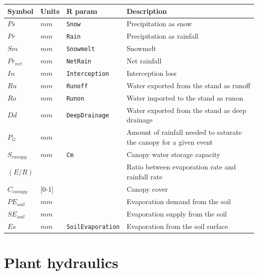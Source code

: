 \documentclass[]{book}
\begin{document}
\begin{longtable}[]{@{}llll@{}}
\toprule
Symbol & Units & R param & Description\tabularnewline
\midrule
\endhead
\(Ps\) & \(mm\) & \texttt{Snow} & Precipitation as snow\tabularnewline
\(Pr\) & \(mm\) & \texttt{Rain} & Precipitation as
rainfall\tabularnewline
\(Sm\) & \(mm\) & \texttt{Snowmelt} & Snowmelt\tabularnewline
\(Pr_{net}\) & \(mm\) & \texttt{NetRain} & Net rainfall\tabularnewline
\(In\) & \(mm\) & \texttt{Interception} & Interception
loss\tabularnewline
\(Ru\) & \(mm\) & \texttt{Runoff} & Water exported from the stand as
runoff\tabularnewline
\(Ro\) & \(mm\) & \texttt{Runon} & Water imported to the stand as
runon\tabularnewline
\(Dd\) & \(mm\) & \texttt{DeepDrainage} & Water exported from the stand
as deep drainage\tabularnewline
\(P_G\) & \(mm\) & & Amount of rainfall needed to saturate the canopy
for a given event\tabularnewline
\(S_{canopy}\) & \(mm\) & \texttt{Cm} & Canopy water storage
capacity\tabularnewline
\((E/R)\) & & & Ratio between evaporation rate and rainfall
rate\tabularnewline
\(C_{canopy}\) & {[}0-1{]} & & Canopy cover\tabularnewline
\(PE_{soil}\) & \(mm\) & & Evaporation demand from the
soil\tabularnewline
\(SE_{soil}\) & \(mm\) & & Evaporation supply from the
soil\tabularnewline
\(Es\) & \(mm\) & \texttt{SoilEvaporation} & Evaporation from the soil
surface\tabularnewline
\bottomrule
\end{longtable}

\section{Plant hydraulics}\label{plant-hydraulics-2}
\end{document}
